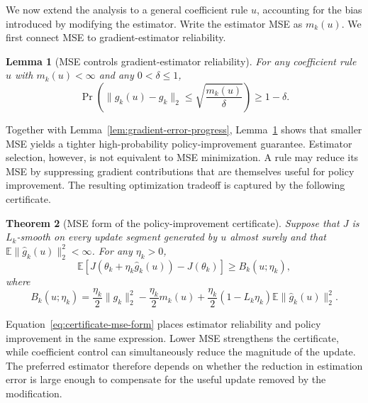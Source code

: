 \documentclass[11pt]{article}
\newtheorem{theorem}{Theorem}
\newtheorem{lemma}[theorem]{Lemma}
\theoremstyle{remark}
\newcommand{\E}{\mathbb{E}}
\begin{document}
We now extend the analysis to a general coefficient rule $u$, accounting for the bias introduced by modifying the estimator. Write the estimator MSE as $m_k(u)$. We first connect MSE to gradient-estimator reliability.

\begin{lemma}[MSE controls gradient-estimator reliability]
\label{lem:general-mse-reliability}
For any coefficient rule $u$ with $m_k(u)<\infty$ and any
$0<\delta\le1$,
\begin{equation}
 \Pr\left(
 \|\widehat g_k(u)-g_k\|_2
 \le
 \sqrt{\frac{m_k(u)}{\delta}}
 \right)
 \ge 1-\delta .
 \label{eq:general-mse-reliability}
\end{equation}
\end{lemma}

Together with Lemma~\ref{lem:gradient-error-progress},
Lemma~\ref{lem:general-mse-reliability} shows that smaller MSE yields a
tighter high-probability policy-improvement guarantee. Estimator selection,
however, is not equivalent to MSE minimization. A rule may reduce its MSE by
suppressing gradient contributions that are themselves useful for policy
improvement. The resulting optimization tradeoff is captured by the following
certificate.

\begin{theorem}[MSE form of the policy-improvement certificate]
\label{thm:fixed-step-certificate}
Suppose that $J$ is $L_k$-smooth on every update segment generated by $u$
almost surely and that
$\E\|\widehat g_k(u)\|_2^2<\infty$. For any $\eta_k>0$,
\begin{equation}
 \E\!\left[
 J(\theta_k+\eta_k\widehat g_k(u))-J(\theta_k)
 \right]
 \ge
 B_k(u;\eta_k),
 \label{eq:full-token-rule-progress}
\end{equation}
where
\begin{equation}
 B_k(u;\eta_k)
 =
 \frac{\eta_k}{2}\|g_k\|_2^2
 -
 \frac{\eta_k}{2}m_k(u)
 +
 \frac{\eta_k}{2}(1-L_k\eta_k)
 \E\|\widehat g_k(u)\|_2^2 .
 \label{eq:certificate-mse-form}
\end{equation}
\end{theorem}

Equation~\eqref{eq:certificate-mse-form} places estimator reliability and
policy improvement in the same expression. Lower MSE strengthens the
certificate, while coefficient control can simultaneously reduce the
magnitude of the update. The preferred estimator therefore depends on whether
the reduction in estimation error is large enough to compensate for the useful update removed by the modification.
\end{document}
